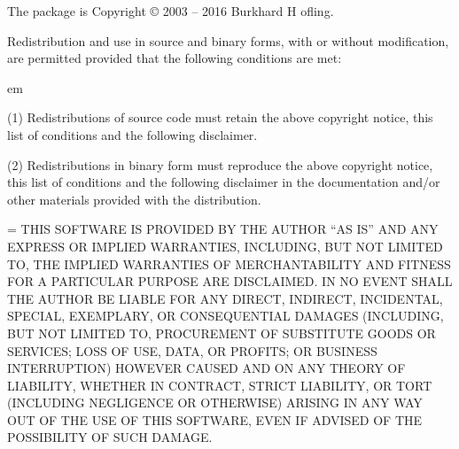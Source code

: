 

The {\GAP} package {\IRREDSOL} is Copyright © 2003 -- 2016 Burkhard H{ o}fling.

Redistribution and use in source and binary forms, with or without
modification, are permitted provided that the following conditions are
met:

{ em
\item{(1)} Redistributions of source code must retain the above copyright
    notice, this list of conditions and the following disclaimer. 

\item{(2)} Redistributions in binary form must reproduce the above copyright
    notice, this list of conditions and the following disclaimer in
    the documentation and/or other materials provided with the
    distribution. \par}
    
{\emergencystretch=\hsize  {} 
THIS SOFTWARE IS PROVIDED BY THE AUTHOR ``AS IS'' AND ANY EXPRESS OR
IMPLIED WARRANTIES, INCLUDING, BUT NOT LIMITED TO, THE IMPLIED
WARRANTIES OF MERCHANTABILITY AND FITNESS FOR A PARTICULAR PURPOSE ARE
DISCLAIMED. IN NO EVENT SHALL THE AUTHOR BE LIABLE FOR ANY DIRECT,
INDIRECT, INCIDENTAL, SPECIAL, EXEMPLARY, OR CONSEQUENTIAL DAMAGES
(INCLUDING, BUT NOT LIMITED TO, PROCUREMENT OF SUBSTITUTE GOODS OR
SERVICES; LOSS OF USE, DATA, OR PROFITS; OR BUSINESS INTERRUPTION)
HOWEVER CAUSED AND ON ANY THEORY OF LIABILITY, WHETHER IN CONTRACT,
STRICT LIABILITY, OR TORT (INCLUDING NEGLIGENCE OR OTHERWISE) ARISING
IN ANY WAY OUT OF THE USE OF THIS SOFTWARE, EVEN IF ADVISED OF THE
POSSIBILITY OF SUCH DAMAGE.\par}


